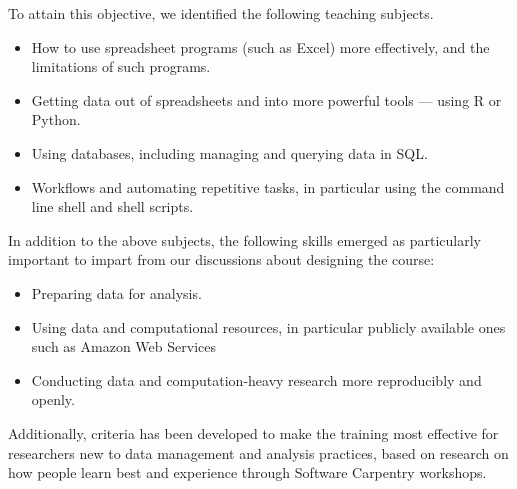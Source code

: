 \documentclass[15]{idcc}
\begin{document}
To attain this objective, we identified the following teaching subjects. 
\begin{itemize}
\item How to use spreadsheet programs (such as Excel) more effectively, and the limitations of such programs. 
\item Getting data out of spreadsheets and into more powerful tools --- using R or Python. 
\item Using databases, including managing and querying data in SQL. 
\item Workflows and automating repetitive tasks, in particular using the command line shell and shell scripts. 
\end{itemize}

In addition to the above subjects, the following skills emerged as particularly important to impart from our discussions about designing the course:
\begin{itemize} 
\item Preparing data for analysis. 
\item Using data and computational resources, in particular publicly available ones such as Amazon Web Services 
\item Conducting data and computation-heavy research more reproducibly and openly. 
\end{itemize}

Additionally, criteria has been developed to make the training most effective for researchers new to data management and analysis practices, based on research on how people 
learn best and experience through Software Carpentry workshops. 
\end{document}

